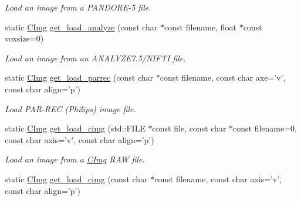 \begin{DoxyCompactItemize}
\begin{DoxyCompactList}\small\item\em Load an image from a PANDORE-\/5 file. \item\end{DoxyCompactList}\item 
\hypertarget{structcimg__library_1_1_c_img_ae9cf619d3ff9e70dfa352216dc67f388}{
static \hyperlink{structcimg__library_1_1_c_img}{CImg} \hyperlink{structcimg__library_1_1_c_img_ae9cf619d3ff9e70dfa352216dc67f388}{get\_\-load\_\-analyze} (const char $\ast$const filename, float $\ast$const voxsize=0)}
\label{structcimg__library_1_1_c_img_ae9cf619d3ff9e70dfa352216dc67f388}

\begin{DoxyCompactList}\small\item\em Load an image from an ANALYZE7.5/NIFTI file. \item\end{DoxyCompactList}\item 
\hypertarget{structcimg__library_1_1_c_img_ab8fa719a8dba627519d3e899536b7b95}{
static \hyperlink{structcimg__library_1_1_c_img}{CImg} \hyperlink{structcimg__library_1_1_c_img_ab8fa719a8dba627519d3e899536b7b95}{get\_\-load\_\-parrec} (const char $\ast$const filename, const char axe='v', const char align='p')}
\label{structcimg__library_1_1_c_img_ab8fa719a8dba627519d3e899536b7b95}

\begin{DoxyCompactList}\small\item\em Load PAR-\/REC (Philips) image file. \item\end{DoxyCompactList}\item 
\hypertarget{structcimg__library_1_1_c_img_a96932bb71719972c24e77ca79b2c1d3a}{
static \hyperlink{structcimg__library_1_1_c_img}{CImg} \hyperlink{structcimg__library_1_1_c_img_a96932bb71719972c24e77ca79b2c1d3a}{get\_\-load\_\-cimg} (std::FILE $\ast$const file, const char $\ast$const filename=0, const char axis='v', const char align='p')}
\label{structcimg__library_1_1_c_img_a96932bb71719972c24e77ca79b2c1d3a}

\begin{DoxyCompactList}\small\item\em Load an image from a \hyperlink{structcimg__library_1_1_c_img}{CImg} RAW file. \item\end{DoxyCompactList}\item 
\hypertarget{structcimg__library_1_1_c_img_a258bb291c24e6dcc1da1cd60905e9d20}{
static \hyperlink{structcimg__library_1_1_c_img}{CImg} \hyperlink{structcimg__library_1_1_c_img_a258bb291c24e6dcc1da1cd60905e9d20}{get\_\-load\_\-cimg} (const char $\ast$const filename, const char axis='v', const char align='p')}
\label{structcimg__library_1_1_c_img_a258bb291c24e6dcc1da1cd60905e9d20}


\end{DoxyCompactItemize}
